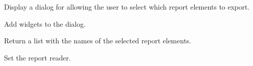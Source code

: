 \documentclass[letterpaper,10pt,english]{sphinxmanual}
\begin{document}
\begin{fulllineitems}
\label{setlyze/gui:setlyze.gui.SelectExportElements}
Display a dialog for allowing the user to select which report
elements to export.

\begin{fulllineitems}
\label{setlyze/gui:setlyze.gui.SelectExportElements.create_layout}
Add widgets to the dialog.

\end{fulllineitems}


\begin{fulllineitems}
\label{setlyze/gui:setlyze.gui.SelectExportElements.get_selected_elements}
Return a list with the names of the selected report
elements.

\end{fulllineitems}


\begin{fulllineitems}
\label{setlyze/gui:setlyze.gui.SelectExportElements.set_report_reader}
Set the report reader.

\end{fulllineitems}


\end{fulllineitems}

\end{document}
